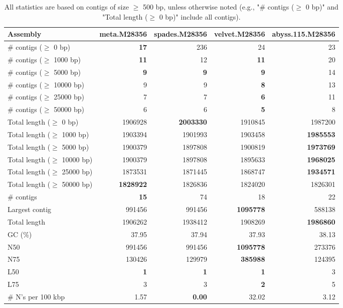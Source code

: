 \documentclass[12pt,a4paper]{article}
\begin{document}
\begin{table}[ht]
\begin{center}
\caption{All statistics are based on contigs of size $\geq$ 500 bp, unless otherwise noted (e.g., "\# contigs ($\geq$ 0 bp)" and "Total length ($\geq$ 0 bp)" include all contigs).}
\begin{tabular}{|l*{4}{|r}|}
\hline
Assembly & meta.M28356 & spades.M28356 & velvet.M28356 & abyss.115.M28356 \\ \hline
\# contigs ($\geq$ 0 bp) & {\bf 17} & 236 & 24 & 23 \\ \hline
\# contigs ($\geq$ 1000 bp) & {\bf 11} & 12 & {\bf 11} & 20 \\ \hline
\# contigs ($\geq$ 5000 bp) & {\bf 9} & {\bf 9} & {\bf 9} & 14 \\ \hline
\# contigs ($\geq$ 10000 bp) & 9 & 9 & {\bf 8} & 13 \\ \hline
\# contigs ($\geq$ 25000 bp) & 7 & 7 & {\bf 6} & 11 \\ \hline
\# contigs ($\geq$ 50000 bp) & 6 & 6 & {\bf 5} & 8 \\ \hline
Total length ($\geq$ 0 bp) & 1906928 & {\bf 2003330} & 1910845 & 1987200 \\ \hline
Total length ($\geq$ 1000 bp) & 1903394 & 1901993 & 1903458 & {\bf 1985553} \\ \hline
Total length ($\geq$ 5000 bp) & 1900379 & 1897808 & 1900819 & {\bf 1973769} \\ \hline
Total length ($\geq$ 10000 bp) & 1900379 & 1897808 & 1895633 & {\bf 1968025} \\ \hline
Total length ($\geq$ 25000 bp) & 1873531 & 1871445 & 1868747 & {\bf 1934571} \\ \hline
Total length ($\geq$ 50000 bp) & {\bf 1828922} & 1826836 & 1824020 & 1826301 \\ \hline
\# contigs & {\bf 15} & 74 & 18 & 22 \\ \hline
Largest contig & 991456 & 991456 & {\bf 1095778} & 588138 \\ \hline
Total length & 1906262 & 1938412 & 1908269 & {\bf 1986860} \\ \hline
GC (\%) & 37.95 & 37.94 & 37.93 & 38.13 \\ \hline
N50 & 991456 & 991456 & {\bf 1095778} & 273376 \\ \hline
N75 & 130426 & 129979 & {\bf 385988} & 124395 \\ \hline
L50 & {\bf 1} & {\bf 1} & {\bf 1} & 3 \\ \hline
L75 & 3 & 3 & {\bf 2} & 5 \\ \hline
\# N's per 100 kbp & 1.57 & {\bf 0.00} & 32.02 & 3.12 \\ \hline
\end{tabular}
\end{center}
\end{table}
\end{document}
